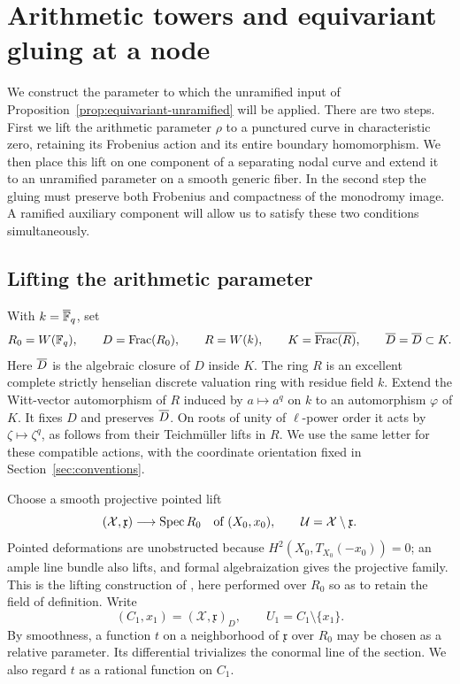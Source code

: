 \section{Arithmetic towers and equivariant gluing at a node}
\label{sec:parameters}

We construct the parameter to which the unramified input of
Proposition~\ref{prop:equivariant-unramified} will be applied.  There are
two steps.  First we lift the arithmetic parameter $\rho$ to a punctured
curve in characteristic zero, retaining its Frobenius action and its
entire boundary homomorphism.  We then place this lift on one component
of a separating nodal curve and extend it to an unramified parameter on
a smooth generic fiber.  In the second step the gluing must preserve
both Frobenius and compactness of the monodromy image.  A ramified
auxiliary component will allow us to satisfy these two conditions
simultaneously.

\subsection{Lifting the arithmetic parameter}

With $k=\overline{\mathbb F}_q$, set
\begin{equation}\label{eq:coefficient-traits}
 R_0=W(\mathbb F_q),\qquad D=\operatorname{Frac}(R_0),\qquad
 R=W(k),\qquad K=\overline{\operatorname{Frac}(R)},\qquad
 \overline D=\overline D\subset K.
\end{equation}
Here $\overline D$ is the algebraic closure of $D$ inside $K$.  The ring $R$
is an excellent complete strictly henselian discrete valuation ring
with residue field $k$.  Extend the Witt-vector automorphism of $R$
induced by $a\mapsto a^q$ on $k$ to an automorphism $\varphi$ of $K$.
It fixes $D$ and preserves $\overline D$.  On roots of unity of $\ell$-power
order it acts by $\zeta\mapsto\zeta^q$, as follows from their
Teichm\"uller lifts in $R$.  We use the same letter for these compatible
actions, with the coordinate orientation fixed in
Section~\ref{sec:conventions}.

Choose a smooth projective pointed lift
\[
 (\mathcal X,\mathfrak x)\longrightarrow\operatorname{Spec} R_0
 \quad\text{of }(X_0,x_0),
 \qquad \mathcal U=\mathcal X\setminus\mathfrak x.
\]
Pointed deformations are unobstructed because
$H^2(X_0,T_{X_0}(-x_0))=0$; an ample line bundle also lifts, and formal
algebraization gives the projective family.  This is the lifting
construction of \cite[Section~8.5]{CT}, here performed over $R_0$ so as
to retain the field of definition.  Write
\[
 (C_1,x_1)=(\mathscr X,\mathfrak x)_D,
 \qquad U_1=C_1\setminus\{x_1\}.
\]
By smoothness, a function $t$ on a neighborhood of $\mathfrak x$ over
$R_0$ may be chosen as a relative parameter.  Its differential
trivializes the conormal line of the section.  We also regard $t$ as a
rational function on $C_1$.

